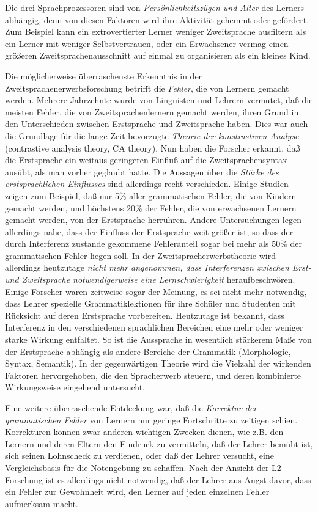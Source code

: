 \documentclass[
  letterpaper,
]{scrbook}
\begin{document}
Die drei Sprachprozessoren sind von \emph{Persönlichkeitszügen und
Alter} des Lerners abhängig, denn von diesen Faktoren wird ihre
Aktivität gehemmt oder gefördert. Zum Beispiel kann ein extrovertierter
Lerner weniger Zweitsprache ausfiltern als ein Lerner mit weniger
Selbstvertrauen, oder ein Erwachsener vermag einen größeren
Zweitsprachenausschnitt auf einmal zu organisieren als ein kleines Kind.

Die möglicherweise überraschenste Erkenntnis in der
Zweitsprachenerwerbsforschung betrifft die \emph{Fehler}, die von
Lernern gemacht werden. Mehrere Jahrzehnte wurde von Linguisten und
Lehrern vermutet, daß die meisten Fehler, die von Zweitsprachenlernern
gemacht werden, ihren Grund in den Unterschieden zwischen Erstsprache
und Zweitsprache haben. Dies war auch die Grundlage für die lange Zeit
bevorzugte \emph{Theorie der konstrastiven Analyse} (contrastive
analysis theory, CA theory). Nun haben die Forscher erkannt, daß die
Erstsprache ein weitaus geringeren Einfluß auf die Zweitsprachensyntax
ausübt, als man vorher geglaubt hatte. Die Aussagen über die
\emph{Stärke des erstsprachlichen Einflusses} sind allerdings recht
verschieden. Einige Studien zeigen zum Beispiel, daß nur 5\% aller
grammatischen Fehler, die von Kindern gemacht werden, und höchstens 20\%
der Fehler, die von erwachsenen Lernern gemacht werden, von der
Erstsprache herrühren. Andere Untersuchungen legen allerdings nahe, dass
der Einfluss der Erstsprache weit größer ist, so dass der durch
Interferenz zustande gekommene Fehleranteil sogar bei mehr als 50\% der
grammatischen Fehler liegen soll. In der Zweitspracherwerbstheorie wird
allerdings heutzutage \emph{nicht mehr angenommen, dass Interferenzen
zwischen Erst- und Zweitsprache notwendigerweise eine Lernschwierigkeit}
heraufbeschwören. Einige Forscher waren zeitweise sogar der Meinung, es
sei nicht mehr notwendig, dass Lehrer spezielle Grammatiklektionen für
ihre Schüler und Studenten mit Rücksicht auf deren Erstsprache
vorbereiten. Heutzutage ist bekannt, dass Interferenz in den
verschiedenen sprachlichen Bereichen eine mehr oder weniger starke
Wirkung entfaltet. So ist die Aussprache in wesentlich stärkerem Maße
von der Erstsprache abhängig als andere Bereiche der Grammatik
(Morphologie, Syntax, Semantik). In der gegenwärtigen Theorie wird die
Vielzahl der wirkenden Faktoren hervorgehoben, die den Spracherwerb
steuern, und deren kombinierte Wirkungsweise eingehend untersucht.

Eine weitere überraschende Entdeckung war, daß die \emph{Korrektur der
grammatischen Fehler} von Lernern nur geringe Fortschritte zu zeitigen
schien. Korrekturen können zwar anderen wichtigen Zwecken dienen, wie
z.B. den Lernern und deren Eltern den Eindruck zu vermitteln, daß der
Lehrer bemüht ist, sich seinen Lohnscheck zu verdienen, oder daß der
Lehrer versucht, eine Vergleichsbasis für die Notengebung zu schaffen.
Nach der Ansicht der L2-Forschung ist es allerdings nicht notwendig, daß
der Lehrer aus Angst davor, dass ein Fehler zur Gewohnheit wird, den
Lerner auf jeden einzelnen Fehler aufmerksam macht.
\end{document}
